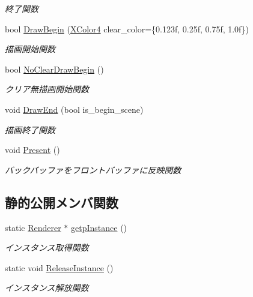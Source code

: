 \begin{DoxyCompactItemize}
\begin{DoxyCompactList}\small\item\em 終了関数 \end{DoxyCompactList}\item 
bool \mbox{\hyperlink{class_renderer_a15d1b99317779905ba4b529d871a1845}{Draw\+Begin}} (\mbox{\hyperlink{_vector3_d_8h_a680c30c4a07d86fe763c7e01169cd6cc}{X\+Color4}} clear\+\_\+color=\{0.\+123f, 0.\+25f, 0.\+75f, 1.\+0f\})
\begin{DoxyCompactList}\small\item\em 描画開始関数 \end{DoxyCompactList}\item 
bool \mbox{\hyperlink{class_renderer_abd9c45a64a141b0b7bbba2dde96e6180}{No\+Clear\+Draw\+Begin}} ()
\begin{DoxyCompactList}\small\item\em クリア無描画開始関数 \end{DoxyCompactList}\item 
void \mbox{\hyperlink{class_renderer_a0393849bd4178a33861780bf07b0deee}{Draw\+End}} (bool is\+\_\+begin\+\_\+scene)
\begin{DoxyCompactList}\small\item\em 描画終了関数 \end{DoxyCompactList}\item 
void \mbox{\hyperlink{class_renderer_a1dac4baae1fa79166442b0778a9c8728}{Present}} ()
\begin{DoxyCompactList}\small\item\em バックバッファをフロントバッファに反映関数 \end{DoxyCompactList}\end{DoxyCompactItemize}
\subsection*{静的公開メンバ関数}
\begin{DoxyCompactItemize}
\item 
static \mbox{\hyperlink{class_renderer}{Renderer}} $\ast$ \mbox{\hyperlink{class_renderer_a995648604452c47b494de005b30de863}{getp\+Instance}} ()
\begin{DoxyCompactList}\small\item\em インスタンス取得関数 \end{DoxyCompactList}\item 
static void \mbox{\hyperlink{class_renderer_aa7ac523172faaf376ecddaed4bdc0781}{Release\+Instance}} ()
\begin{DoxyCompactList}\small\item\em インスタンス解放関数 \end{DoxyCompactList}\end{DoxyCompactItemize}
